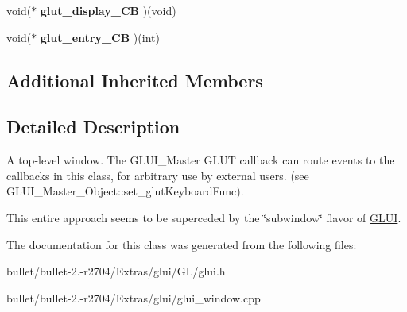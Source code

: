 \begin{DoxyCompactItemize}
\item 
\hypertarget{class_g_l_u_i___glut___window_a08233e5acd66dc19bf453e423b0cd6c9}{void($\ast$ {\bfseries glut\+\_\+display\+\_\+\+C\+B} )(void)}\label{class_g_l_u_i___glut___window_a08233e5acd66dc19bf453e423b0cd6c9}

\item 
\hypertarget{class_g_l_u_i___glut___window_a0f17b9ee70f25c694dfb546b0d2ae6a8}{void($\ast$ {\bfseries glut\+\_\+entry\+\_\+\+C\+B} )(int)}\label{class_g_l_u_i___glut___window_a0f17b9ee70f25c694dfb546b0d2ae6a8}

\end{DoxyCompactItemize}
\subsection*{Additional Inherited Members}


\subsection{Detailed Description}
A top-\/level window. The G\+L\+U\+I\+\_\+\+Master G\+L\+U\+T callback can route events to the callbacks in this class, for arbitrary use by external users. (see G\+L\+U\+I\+\_\+\+Master\+\_\+\+Object\+::set\+\_\+glut\+Keyboard\+Func).

This entire approach seems to be superceded by the \char`\"{}subwindow\char`\"{} flavor of \hyperlink{class_g_l_u_i}{G\+L\+U\+I}. 

The documentation for this class was generated from the following files\+:\begin{DoxyCompactItemize}
\item 
bullet/bullet-\/2.-\/r2704/\+Extras/glui/\+G\+L/glui.\+h\item 
bullet/bullet-\/2.-\/r2704/\+Extras/glui/glui\+\_\+window.\+cpp\end{DoxyCompactItemize}
